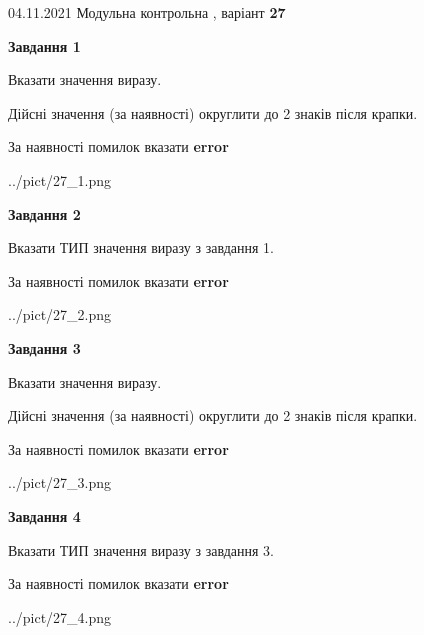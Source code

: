 \documentclass[11pt, ukrainian]{article}
\begin{document}
{04.11.2021 Модульна контрольна , варіант  \No \textbf { 27 }\par}
{
\begin {large}
{\begin {center}\textbf{Завдання 1}\end {center}}\par
Вказати значення виразу. \par
Дійсні значення (за наявності) округлити до 2 знаків після крапки. \par
За наявності помилок вказати \textbf{error}

\begin{center}
	{../pict/27_1.png}
\end{center}
\newpage

{\begin {center}\textbf{Завдання 2}\end {center}}\par
Вказати ТИП значення виразу з завдання 1. \par
За наявності помилок вказати \textbf{error}

\begin{center}
	{../pict/27_2.png}
\end{center}
\newpage

{\begin {center}\textbf{Завдання 3}\end {center}}\par
Вказати значення виразу. \par
Дійсні значення (за наявності) округлити до 2 знаків після крапки. \par
За наявності помилок вказати \textbf{error}

\begin{center}
	{../pict/27_3.png}
\end{center}
\newpage

{\begin {center}\textbf{Завдання 4}\end {center}}\par
Вказати ТИП значення виразу з завдання 3. \par
За наявності помилок вказати \textbf{error}

\begin{center}
	{../pict/27_4.png}
\end{center}
\newpage


\end{large}}
\end{document}
